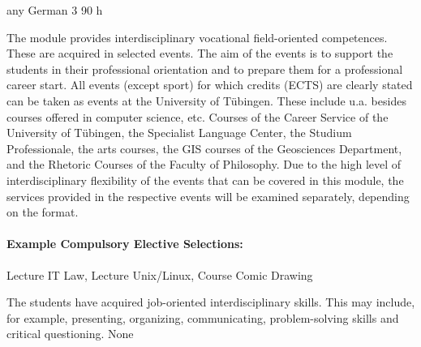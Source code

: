 {any}
{German}
{3}
{90 h}
{The module provides interdisciplinary vocational field-oriented competences. These are acquired in selected events. The aim of the events is to support the students in their professional orientation and to prepare them for a professional career start. All events (except sport) for which credits (ECTS) are clearly stated can be taken as events at the University of Tübingen. These include u.a. besides courses offered in computer science, etc. Courses of the Career Service of the University of Tübingen, the Specialist Language Center, the Studium Professionale, the arts courses, the GIS courses of the Geosciences Department, and the Rhetoric Courses of the Faculty of Philosophy. Due to the high level of interdisciplinary flexibility of the events that can be covered in this module, the services provided in the respective events will be examined separately, depending on the format.
\paragraph{Example Compulsory Elective Selections:} Lecture IT Law, Lecture Unix/Linux, Course Comic Drawing} 
{The students have acquired job-oriented interdisciplinary skills. This may include, for example, presenting, organizing, communicating, problem-solving skills and critical questioning.}
{None}